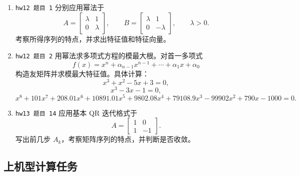 \documentclass{article}
\begin{document}
\begin{enumerate}
  \item \texttt{hw12 题目 1} 分别应用幂法于
  \[
    A=\begin{bmatrix}\lambda&1\\0&\lambda\end{bmatrix},\qquad
    B=\begin{bmatrix}\lambda&1\\0&-\lambda\end{bmatrix},\qquad \lambda>0.
  \]
  考察所得序列的特点，并求出特征值和特征向量。

  \item \texttt{hw12 题目 2} 用幂法求多项式方程的模最大根。对首一多项式
  \[
    f(x)=x^n+\alpha_{n-1}x^{n-1}+\cdots+\alpha_1x+\alpha_0
  \]
  构造友矩阵并求模最大特征值。具体计算：
  \[
    x^3+x^2-5x+3=0,
  \]
  \[
    x^3-3x-1=0,
  \]
  \[
    x^8+101x^7+208.01x^6+10891.01x^5+9802.08x^4
    +79108.9x^3-99902x^2+790x-1000=0.
  \]

  \item \texttt{hw13 题目 14} 应用基本 QR 迭代格式于
  \[
    A=\begin{bmatrix}1&0\\1&-1\end{bmatrix}.
  \]
  写出前几步 $A_k$，考察矩阵序列的特点，并判断是否收敛。
\end{enumerate}

\subsection{上机型计算任务}
\end{document}
